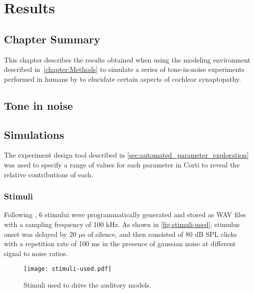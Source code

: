 \chapter{Results}
\label{chapter:Results}
\thispagestyle{myheadings}

\graphicspath{{5_Results/Figures/}}
\section{Chapter Summary} %
\label{sec:results_summary}
This chapter describes the results obtained when using the modeling environment described in~\autoref{chapter:Methods} to simulate a series of tone-in-noise experiments performed in humans by \citeauthor{Mehraei2016Auditory} to elucidate certain aspects of cochlear synaptopathy. 

\section{Tone in noise} %
\label{sec:tone_in_noise}


\section{Simulations}
The experiment design tool described in \autoref{sec:automated_parameter_exploration} was used to specify a range of values for each parameter in Corti to reveal the relative contributions of each. 

\subsection{Stimuli} %
\label{sub:stimuli}
Following \citeauthor{Mehraei2015Auditory,Mehraei2016Auditory}, 6 stimului were programmatically generated and stored as WAV files with a sampling frequency of 100 kHz.  As shown in \autoref{fig:stimuli-used}, stimulus onset was delayed by 20 $\mu$s of silence, and then consisted of 80 dB SPL clicks with a repetition rate of 100 ms in the presence of gaussian noise at different signal to noise ratios. 

\begin{figure}[htbp]
	\centering
	\texttt{[image: stimuli-used.pdf]}
	\caption[Experimental Stimuli]{Stimuli used to drive the auditory models.}
	\label{fig:stimuli-used}
\end{figure}

